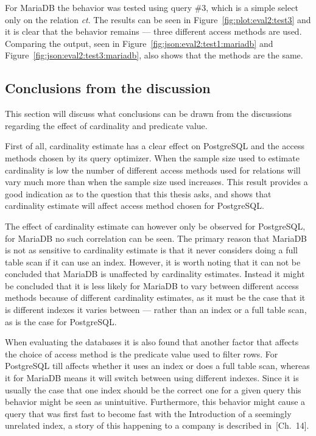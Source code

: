 For MariaDB the behavior was tested using query \#3, which is a simple select
only on the relation \textit{ct}. The results can be seen in
Figure~\ref{fig:plot:eval2:test3} and it is clear that the behavior remains ---
three different access methods are used. Comparing the output, seen in
Figure~\ref{fig:json:eval2:test1:mariadb} and
Figure~\ref{fig:json:eval2:test3:mariadb}, also shows that the methods are the
same.

\subsection{Conclusions from the discussion}
This section will discuss what conclusions can be drawn from the discussions
regarding the effect of cardinality and predicate value.

First of all, cardinality estimate has a clear effect on PostgreSQL and the
access methods chosen by its query optimizer. When the sample size used to
estimate cardinality is low the number of different access methods used for
relations will vary much more than when the sample size used increases. This
result provides a good indication as to the question that this thesis asks, and
shows that cardinality estimate will affect access method chosen for PostgreSQL.\@

The effect of cardinality estimate can however only be observed for PostgreSQL,
for MariaDB no such correlation can be seen. The primary reason that MariaDB is
not as sensitive to cardinality estimate is that it never considers doing a full
table scan if it can use an index. However, it is worth noting that it can not
be concluded that MariaDB is unaffected by cardinality estimates. Instead it
might be concluded that it is less likely for MariaDB to vary between different
access methods because of different cardinality estimates, as it must be the
case that it is different indexes it varies between --- rather than an index or
a full table scan, as is the case for PostgreSQL.\@

When evaluating the databases it is also found that another factor that affects
the choice of access method is the predicate value used to filter rows. For
PostgreSQL till affects whether it uses an index or does a full table scan,
whereas it for MariaDB means it will switch between using different indexes.
Since it is usually the case that one index should be the correct one for a
given query this behavior might be seen as unintuitive. Furthermore, this
behavior might cause a query that was first fast to become fast with the
Introduction of a seemingly unrelated index, a story of this happening to a
company is described in~\cite{lahdenmaki_2005_relational_rdidatodossea}[Ch.~14].

